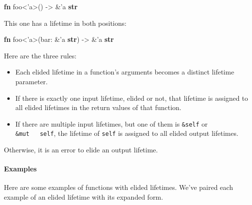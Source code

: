 \documentclass[a4paper,]{book}
\newenvironment{Shaded}{\begin{snugshade}}{\end{snugshade}}
\newcommand{\KeywordTok}[1]{\textcolor[rgb]{0.13,0.29,0.53}{\textbf{{#1}}}}
\newcommand{\OtherTok}[1]{\textcolor[rgb]{0.56,0.35,0.01}{{#1}}}
\newcommand{\NormalTok}[1]{{#1}}
\let\oldparagraph\paragraph
\renewcommand{\paragraph}[1]{\oldparagraph{#1}\mbox{}}
\begin{document}
\begin{Shaded}
\begin{Highlighting}[]
\KeywordTok{fn} \NormalTok{foo<}\OtherTok{'a}\NormalTok{>() -> &}\OtherTok{'a} \KeywordTok{str}
\end{Highlighting}
\end{Shaded}

This one has a lifetime in both positions:

\begin{Shaded}
\begin{Highlighting}[]
\KeywordTok{fn} \NormalTok{foo<}\OtherTok{'a}\NormalTok{>(bar: &}\OtherTok{'a} \KeywordTok{str}\NormalTok{) -> &}\OtherTok{'a} \KeywordTok{str}
\end{Highlighting}
\end{Shaded}

Here are the three rules:

\begin{itemize}
\item
  Each elided lifetime in a function's arguments becomes a distinct
  lifetime parameter.
\item
  If there is exactly one input lifetime, elided or not, that lifetime
  is assigned to all elided lifetimes in the return values of that
  function.
\item
  If there are multiple input lifetimes, but one of them is
  \texttt{\&self} or \texttt{\&mut\ \ \ self}, the lifetime of
  \texttt{self} is assigned to all elided output lifetimes.
\end{itemize}

Otherwise, it is an error to elide an output lifetime.

\paragraph{Examples}\label{examples}

Here are some examples of functions with elided lifetimes. We've paired
each example of an elided lifetime with its expanded form.
\end{document}
